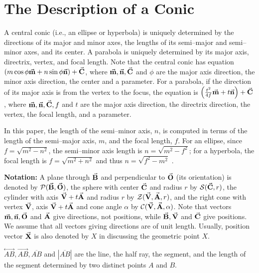 \section{The Description of a Conic}

A central conic (i.e., an ellipse or hyperbola) 
is uniquely determined by the directions of
its major and minor axes, the lengths of its semi--major and semi--minor 
axes, and its center.
A parabola is uniquely determined by its major axis, 
directrix, vertex, and focal length.
Note that the central conic has equation $(m\cos\phi\vec{\bf m}+n\sin\phi\vec{\bf n}
)+\vec{\bf C}$, where $\vec{\bf m},\vec{\bf n},\vec{\bf C}$ and $\phi$ are the major
axis direction, the minor axis direction, the center and a parameter.
For a parabola, if the direction of its major axis is from the vertex to the
focus, the equation is $\left(\frac{t^2}{4f}\vec{\bf m}+t\vec{\bf n}\right)+
\vec{\bf C}$, where $\vec{\bf m},\vec{\bf n},\vec{\bf C},f$ and $t$ are the major
axis direction, the directrix direction, the vertex, the focal length,
and a parameter.

In this paper, the length of the semi--minor axis, $n$, is computed 
in terms of the length of the semi--major axis, $m$, and the focal length, $f$.
For an ellipse, since $f=\sqrt{m^2-n^2}$, 
the semi--minor axis length is $n=\sqrt{m^2-f^2}$;  
for a hyperbola, the focal length is
$f=\sqrt{m^2+n^2}$ and thus $n=\sqrt{f^2-m^2}$ \cite{salmon:1954}.  %

{\bf Notation:}
A plane through
$\vec{\bf B}$ and perpendicular to $\vec{\bf O}$ (its orientation) is denoted by
${\cal P}(\vec{\bf B},\vec{\bf O})$, the sphere with center $\vec{\bf C}$ and radius
$r$ by ${\cal S}(\vec{\bf C},r)$, the cylinder with axis $\vec{\bf V}+t\vec{\bf A}$
and radius $r$ by ${\cal Z}(\vec{\bf V},\vec{\bf A},r)$, and the right cone
with vertex $\vec{\bf V}$, axis $\vec{\bf V}+t\vec{\bf A}$ and cone angle $\alpha$
by ${\cal C}(\vec{\bf V},\vec{\bf A},\alpha)$.  Note that vectors $\vec{\bf m},
\vec{\bf n}, \vec{\bf O}$ and $\vec{\bf A}$ give directions, not positions, while
$\vec{\bf B},\vec{\bf V}$ and $\vec{\bf C}$ give positions.
We assume that all vectors giving directions are of unit length.
Usually, position vector $\vec{\bf X}$ is also denoted by $X$ in discussing the
geometric point $X$.

     $\stackrel{\longleftrightarrow}{AB}, \stackrel{\longrightarrow}{AB},
\overline{AB}$ and $|\overline{AB}|$ are the line, the half ray, the segment,
and the length of the segment determined by two distinct points $A$ and $B$.


